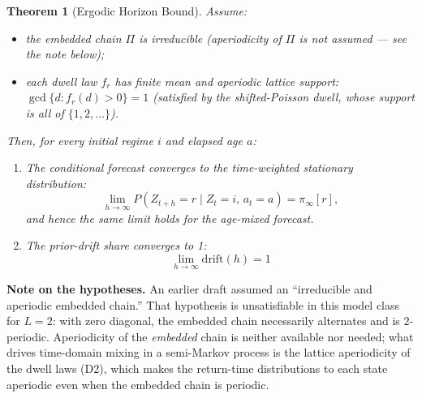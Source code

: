 \documentclass[11pt,a4paper]{article}
\newtheorem{theorem}{Theorem}
\begin{document}
\begin{theorem}[Ergodic Horizon Bound]
Assume: %
\begin{itemize}
    \item[(D1)] the embedded chain $\Pi$ is irreducible (aperiodicity of $\Pi$ is \emph{not} assumed --- see the note below); %
    \item[(D2)] each dwell law $f_r$ has finite mean and aperiodic lattice support: $\gcd\{d : f_r(d) > 0\} = 1$ (satisfied by the shifted-Poisson dwell, whose support is all of $\{1, 2, \dots\}$). %
\end{itemize}
Then, for every initial regime $i$ and elapsed age $a$:
\begin{enumerate}
    \item The conditional forecast converges to the time-weighted stationary distribution:
    \[
    \lim_{h \to \infty} P(Z_{t+h} = r \mid Z_t = i,\, a_t = a) = \pi_\infty[r], %
    \]
    and hence the same limit holds for the age-mixed forecast.
    \item The prior-drift share converges to 1:
    \[
    \lim_{h \to \infty} \text{drift}(h) = 1
    \]
\end{enumerate}
\end{theorem}

\noindent\textbf{Note on the hypotheses.} An earlier draft assumed an ``irreducible and aperiodic embedded chain.'' That hypothesis is unsatisfiable in this model class for $L = 2$: with zero diagonal, the embedded chain necessarily alternates and is $2$-periodic. Aperiodicity of the \emph{embedded} chain is neither available nor needed; what drives time-domain mixing in a semi-Markov process is the lattice aperiodicity of the dwell laws (D2), which makes the return-time distributions to each state aperiodic even when the embedded chain is periodic. %
\end{document}
